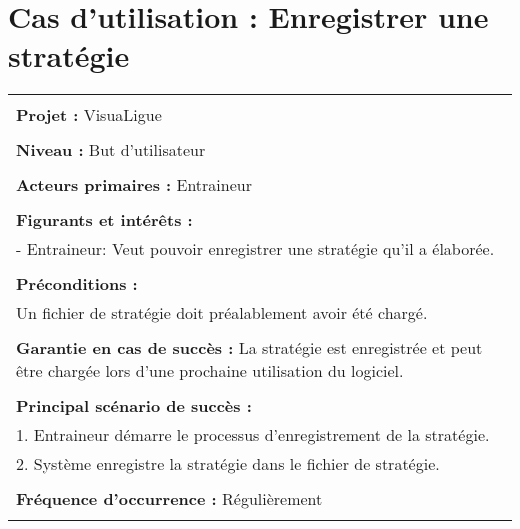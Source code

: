 \section{Cas d'utilisation : Enregistrer une stratégie}
\begin{longtable}{|p{16cm}|}
	\hline
	\\
	\textbf{Projet :} VisuaLigue\\
	\\
	\textbf{Niveau :} But d'utilisateur\\
	\\
	\textbf{Acteurs primaires :} Entraineur\\
	\\
	\textbf{Figurants et intérêts :} \\
	- Entraineur: Veut pouvoir enregistrer une stratégie qu'il a élaborée.\\
	\\
	\textbf{Préconditions :} \\
	Un fichier de stratégie doit préalablement avoir été chargé. \\
	\\
	\textbf{Garantie en cas de succès :} La stratégie est enregistrée et peut être chargée lors d'une prochaine utilisation du logiciel.\\
	\\
	\textbf{Principal scénario de succès :}\\
	1. Entraineur démarre le processus d'enregistrement de la stratégie.\\
	2. Système enregistre la stratégie dans le fichier de stratégie.\\
	\\
	\textbf{Fréquence d'occurrence :} Régulièrement\\
	\\
	\hline
\end{longtable}

